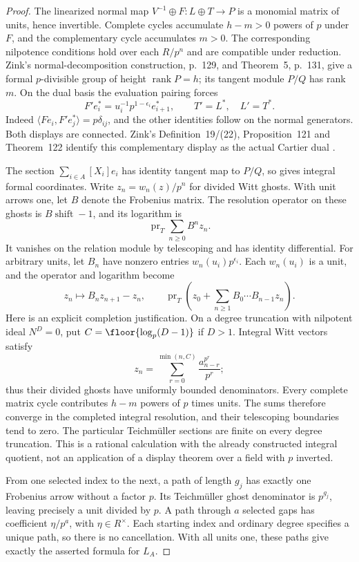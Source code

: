 \documentclass[11pt,a4paper]{article}
\theoremstyle{definition}\newtheorem{remark}[theorem]{Remark}
\begin{document}
\begin{proof}
The linearized normal map $V^{-1}\oplus F:L\oplus T\to P$ is a monomial matrix of units, hence invertible. Complete cycles accumulate $h-m>0$ powers of $p$ under $F$, and the complementary cycle accumulates $m>0$. The corresponding nilpotence conditions hold over each $R/p^n$ and are compatible under reduction. Zink's normal-decomposition construction, p.~129, and Theorem~5, p.~131, give a formal $p$-divisible group of height $\operatorname{rank}P=h$; its tangent module $P/Q$ has rank $m$. On the dual basis the evaluation pairing forces
\[
 F'e_i^*=u_i^{-1}p^{1-\epsilon_i}e_{i+1}^*,\qquad
 T'=L^*,\quad L'=T^*.
\]
Indeed $\langle Fe_i,F'e_j^*\rangle=p\delta_{ij}$, and the other identities follow on the normal generators. Both displays are connected. Zink's Definition~19/(22), Proposition~121 and Theorem~122 identify this complementary display as the actual Cartier dual \cite{Zink}.

The section $\sum_{i\in A}[X_i]e_i$ has identity tangent map to $P/Q$, so gives integral formal coordinates. Write $z_n=w_n(z)/p^n$ for divided Witt ghosts. With unit arrows one, let $B$ denote the Frobenius matrix. The resolution operator on these ghosts is $B\operatorname{shift}-1$, and its logarithm is
\[
 \operatorname{pr}_T\sum_{n\ge0}B^nz_n.
\]
It vanishes on the relation module by telescoping and has identity differential. For arbitrary units, let $B_n$ have nonzero entries $w_n(u_i)p^{\epsilon_i}$. Each $w_n(u_i)$ is a unit, and the operator and logarithm become
\[
 z_n\longmapsto B_nz_{n+1}-z_n,\qquad
 \operatorname{pr}_T\left(z_0+\sum_{n\ge1}B_0\cdots B_{n-1}z_n\right).
\]
Here is an explicit completion justification. On a degree truncation with nilpotent ideal $N^D=0$, put $C=\floor{\log_p(D-1)}$ if $D>1$. Integral Witt vectors satisfy
\[
 z_n=\sum_{r=0}^{\min(n,C)}
       \frac{a_{n-r}^{p^r}}{p^r};
\]
thus their divided ghosts have uniformly bounded denominators. Every complete matrix cycle contributes $h-m$ powers of $p$ times units. The sums therefore converge in the completed integral resolution, and their telescoping boundaries tend to zero. The particular Teichm\"uller sections are finite on every degree truncation. This is a rational calculation with the already constructed integral quotient, not an application of a display theorem over a field with $p$ inverted.

From one selected index to the next, a path of length $g_j$ has exactly one Frobenius arrow without a factor $p$. Its Teichm\"uller ghost denominator is $p^{g_j}$, leaving precisely a unit divided by $p$. A path through $a$ selected gaps has coefficient $\eta/p^a$, with $\eta\in R^\times$. Each starting index and ordinary degree specifies a unique path, so there is no cancellation. With all units one, these paths give exactly the asserted formula for $L_A$.


\end{proof}
\end{document}
